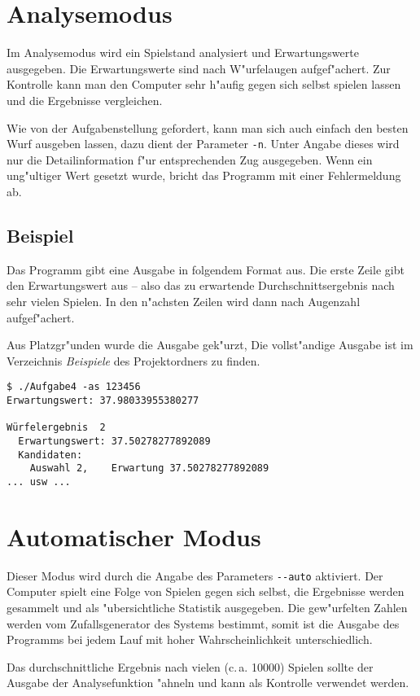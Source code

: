 \documentclass{scrreprt}
\begin{document}
\section{Analysemodus}
Im Analysemodus wird ein Spielstand analysiert und Erwartungswerte ausgegeben.
Die Erwartungswerte sind nach W"urfelaugen aufgef"achert.  Zur Kontrolle kann
man den Computer sehr h"aufig gegen sich selbst spielen lassen und die
Ergebnisse vergleichen.

Wie von der Aufgabenstellung gefordert, kann man sich auch einfach den besten
Wurf ausgeben lassen, dazu dient der Parameter \texttt{-n}.  Unter Angabe dieses
wird nur die Detailinformation f"ur entsprechenden Zug ausgegeben. Wenn ein
ung"ultiger Wert gesetzt wurde, bricht das Programm mit einer Fehlermeldung ab.

\subsection*{Beispiel}
Das Programm gibt eine Ausgabe in folgendem Format aus. Die erste Zeile gibt den
Erwartungswert aus -- also das zu erwartende Durchschnittsergebnis nach sehr
vielen Spielen.  In den n"achsten Zeilen wird dann nach Augenzahl aufgef"achert.

Aus Platzgr"unden wurde die Ausgabe gek"urzt, Die vollst"andige Ausgabe ist im
Verzeichnis \emph{Beispiele} des Projektordners zu finden.

\begin{verbatim}
$ ./Aufgabe4 -as 123456
Erwartungswert: 37.98033955380277

Würfelergebnis  2
  Erwartungswert: 37.50278277892089
  Kandidaten:
    Auswahl 2,    Erwartung 37.50278277892089
... usw ...
\end{verbatim}

\section{Automatischer Modus}
Dieser Modus wird durch die Angabe des Parameters \texttt{-\/-auto} aktiviert.
Der Computer spielt eine Folge von Spielen gegen sich selbst, die Ergebnisse
werden gesammelt und als "ubersichtliche Statistik ausgegeben.  Die gew"urfelten
Zahlen werden vom Zufallsgenerator des Systems bestimmt, somit ist die Ausgabe
des Programms bei jedem Lauf mit hoher Wahrscheinlichkeit unterschiedlich.

Das durchschnittliche Ergebnis nach vielen (c.\,a. 10000) Spielen sollte der
Ausgabe der Analysefunktion "ahneln und kann als Kontrolle verwendet werden.
\end{document}
